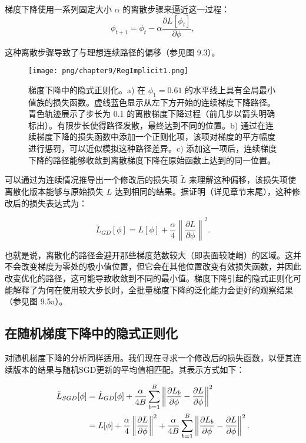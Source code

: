 梯度下降使用一系列固定大小 \(\alpha\) 的离散步骤来逼近这一过程：
\begin{equation}
\phi_{t+1} = \phi_t - \alpha \frac{\partial L[\phi_t]}{\partial \phi} , 
\end{equation}

这种离散步骤导致了与理想连续路径的偏移（参见图 9.3）。

\begin{figure}[ht!]
	\centering
	\texttt{[image: png/chapter9/RegImplicit1.png]}
	\caption{梯度下降中的隐式正则化。a) 在 \(\phi_1 = 0.61\) 的水平线上具有全局最小值族的损失函数。虚线蓝色显示从左下方开始的连续梯度下降路径。青色轨迹展示了步长为 0.1 的离散梯度下降过程（前几步以箭头明确标出）。有限步长使得路径发散，最终达到不同的位置。b) 通过在连续梯度下降的损失函数中添加一个正则化项，该项对梯度的平方幅度进行惩罚，可以近似模拟这种路径差异。c) 添加这一项后，连续梯度下降的路径能够收敛到离散梯度下降在原始函数上达到的同一位置。}
\end{figure}


可以通过为连续情况推导出一个修改后的损失项 \(\tilde{L}\) 来理解这种偏移，该损失项使离散化版本能够与原始损失 \(L\) 达到相同的结果。据证明（详见章节末尾），这种修改后的损失表达式为：

\begin{equation}
\tilde{L}_{GD}[\phi] = L[\phi] + \frac{\alpha}{4} \left\| \frac{\partial L}{\partial \phi} \right\|^2 . 
\end{equation}

也就是说，离散化的路径会避开那些梯度范数较大（即表面较陡峭）的区域。这并不会改变梯度为零处的极小值位置，但它会在其他位置改变有效损失函数，并因此改变优化的路径，这可能导致收敛到不同的最小值。梯度下降引起的隐式正则化可能解释了为何在使用较大步长时，全批量梯度下降的泛化能力会更好的观察结果（参见图 9.5a）。

\subsection{在随机梯度下降中的隐式正则化}
对随机梯度下降的分析同样适用。我们现在寻求一个修改后的损失函数，以便其连续版本的结果与随机SGD更新的平均值相匹配。其表示方式如下：


\begin{align}
	\tilde{L}_{SGD}[\phi] &= \tilde{L}_{GD}[\phi] + \frac{\alpha}{4B} \sum_{b=1}^{B} \left\| \frac{\partial L_b}{\partial \phi} - \frac{\partial L}{\partial \phi} \right\|^2 \notag \\
	&= L[\phi] + \frac{\alpha}{4} \left\| \frac{\partial L}{\partial \phi} \right\|^2 + \frac{\alpha}{4B} \sum_{b=1}^{B} \left\| \frac{\partial L_b}{\partial \phi} - \frac{\partial L}{\partial \phi} \right\|^2 . 
\end{align} 


